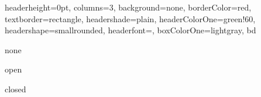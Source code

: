 \documentclass[portrait,fontscale=1,margin=0.2cm,paperwidth=15truecm, paperheight=1.5cm,debug]{baposter}
\begin{document}
\begin{poster}{
  headerheight=0pt,
  columns=3,
  background=none,
  borderColor=red,
  textborder=rectangle,
  headershade=plain,
  headerColorOne=green!60,
  headershape=smallrounded,
  headerfont={},
  boxColorOne=lightgray,
}{}{b}{}{d}

\begin{posterbox}[column=0,boxColorOne=lightgray,height=bottom,headerborder=none]{none}
\end{posterbox}

\begin{posterbox}[column=1,boxColorOne=lightgray,height=bottom,headerborder=open]{open}
\end{posterbox}

\begin{posterbox}[column=2,boxColorOne=lightgray,height=bottom,headerborder=closed]{closed}
\end{posterbox}

\end{poster}
\end{document}
